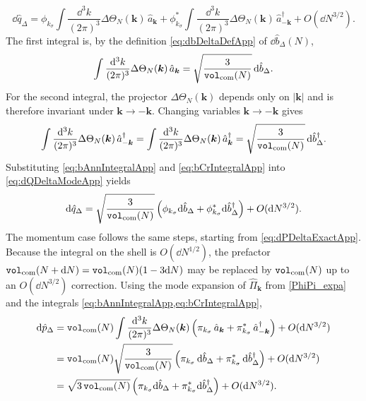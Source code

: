 \documentclass{article}
\newcommand{\VF}{\mathtt{vol}_{\rm com}}
\newcommand{\hpi}{\hat{\Pi}}
\numberwithin{equation}{section}
\begin{document}
	\begin{equation}
		\dd\hat q_{\Delta} = \phi_{k_\sigma}\!\int\frac{\dd^3k}{(2\pi)^3} \Delta\Theta_N(\bm k)\,\hat a_{\bm k} + \phi^*_{k_\sigma}\!\int\frac{\dd^3k}{(2\pi)^3} \Delta\Theta_N(\bm k)\,\hat a^\dagger_{-\bm k} + O(\dd N^{3/2}).
		\label{eq:dQDeltaModeApp}
	\end{equation}
	The first integral is, by the definition \cref{eq:dbDeltaDefApp} of \(\dd\hat b_\Delta(N)\),
	\begin{equation}
		\int\frac{\dd^3k}{(2\pi)^3} \Delta\Theta_N(\bm k)\,\hat a_{\bm k} = \sqrt{\frac{3}{\VF(N)}}\,\dd\hat b_{\Delta}.
		\label{eq:bAnnIntegralApp}
	\end{equation}
	For the second integral, the projector \(\Delta\Theta_N(\bm k)\) depends only on \(|\bm k|\) and is therefore invariant under \(\bm k\to-\bm k\). Changing variables \(\bm k\to-\bm k\) gives
	\begin{equation}
		\int\frac{\dd^3k}{(2\pi)^3} \Delta\Theta_N(\bm k)\,\hat a^\dagger_{-\bm k} = \int\frac{\dd^3k}{(2\pi)^3} \Delta\Theta_N(\bm k)\,\hat a^\dagger_{\bm k} = \sqrt{\frac{3}{\VF(N)}}\,\dd\hat b^\dagger_{\Delta}.
		\label{eq:bCrIntegralApp}
	\end{equation}
	Substituting \cref{eq:bAnnIntegralApp} and \cref{eq:bCrIntegralApp} into \cref{eq:dQDeltaModeApp} yields
	\begin{equation}
		\dd\hat q_\Delta = \sqrt{\frac{3}{\VF(N)}} \left( \phi_{k_{\sigma}} \dd\hat b_\Delta + \phi_{k_{\sigma}}^* \dd\hat b_\Delta^\dagger \right) + O(\dd N^{3/2}).
		\label{eq:dQDeltaLeadingApp}
	\end{equation}
	The momentum case follows the same steps, starting from \cref{eq:dPDeltaExactApp}. Because the integral on the shell is \(O(\dd N^{1/2})\), the prefactor \(\VF(N+\dd N)=\VF(N)(1-3\dd N)\) may be replaced by \(\VF(N)\) up to an \(O(\dd N^{3/2})\) correction. Using the mode expansion of \(\hpi_{\bm k}\) from \cref{PhiPi_expa} and the integrals \cref{eq:bAnnIntegralApp,eq:bCrIntegralApp},
	\begin{align}
		\dd\hat p_\Delta &= \VF(N) \int\frac{\dd^3k}{(2\pi)^3} \Delta\Theta_N(\bm k) \left( \pi_{k_\sigma}\,\hat a_{\bm k} + \pi^*_{k_\sigma}\,\hat a^\dagger_{-\bm k} \right) + O(\dd N^{3/2}) \nonumber\\ &= \VF(N) \sqrt{\frac{3}{\VF(N)}} \left( \pi_{k_\sigma}\,\dd\hat b_\Delta + \pi^*_{k_\sigma}\,\dd\hat b_\Delta^\dagger \right) + O(\dd N^{3/2}) \nonumber\\ &= \sqrt{3\,\VF(N)} \left( \pi_{k_{\sigma}} \dd\hat b_\Delta + \pi_{k_{\sigma}}^* \dd\hat b_\Delta^\dagger \right) + O(\dd N^{3/2}).
		\label{eq:dPDeltaLeadingApp}
	\end{align}
\end{document}
